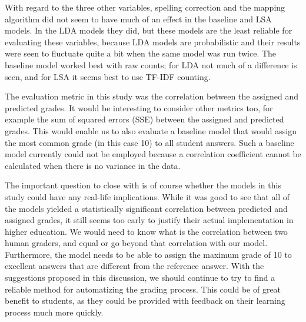 \documentclass[a4paper,10pt,twoside]{article}
\begin{document}
With regard to the three other variables, spelling correction and the mapping algorithm did not seem to have much of an effect in the baseline and LSA models. In the LDA models they did, but these models are the least reliable for evaluating these variables, because LDA models are probabilistic and their results were seen to fluctuate quite a bit when the same model was run twice. The baseline model worked best with raw counts; for LDA not much of a difference is seen, and for LSA it seems best to use TF-IDF counting.

The evaluation metric in this study was the correlation between the assigned and predicted grades. It would be interesting to consider other metrics too, for example the sum of squared errors (SSE) between the assigned and predicted grades. This would enable us to also evaluate a baseline model that would assign the most common grade (in this case 10) to all student answers. Such a baseline model currently could not be employed because a correlation coefficient cannot be calculated when there is no variance in the data.

The important question to close with is of course whether the models in this study could have any real-life implications. While it was good to see that all of the models yielded a statistically significant correlation between predicted and assigned grades, it still seems too early to justify their actual implementation in higher education. We would need to know what is the correlation between two human graders, and equal or go beyond that correlation with our model. Furthermore, the model needs to be able to assign the maximum grade of 10 to excellent answers that are different from the reference answer. With the suggestions proposed in this discussion, we should continue to try to find a reliable method for automatizing the grading process. This could be of great benefit to students, as they could be provided with feedback on their learning process much more quickly.





 
 
\end{document}
